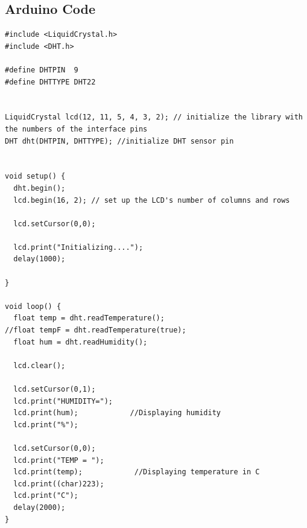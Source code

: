 \subsection{Arduino Code}
    \begin{lstlisting}[style = Arduino]
#include <LiquidCrystal.h>
#include <DHT.h>

#define DHTPIN  9
#define DHTTYPE DHT22 


LiquidCrystal lcd(12, 11, 5, 4, 3, 2); // initialize the library with the numbers of the interface pins
DHT dht(DHTPIN, DHTTYPE); //initialize DHT sensor pin


void setup() {
  dht.begin();
  lcd.begin(16, 2); // set up the LCD's number of columns and rows
  
  lcd.setCursor(0,0);

  lcd.print("Initializing....");
  delay(1000);

}

void loop() {
  float temp = dht.readTemperature();
//float tempF = dht.readTemperature(true);
  float hum = dht.readHumidity();

  lcd.clear();
  
  lcd.setCursor(0,1);
  lcd.print("HUMIDITY=");
  lcd.print(hum);            //Displaying humidity
  lcd.print("%");

  lcd.setCursor(0,0);
  lcd.print("TEMP = ");
  lcd.print(temp);            //Displaying temperature in C
  lcd.print((char)223);
  lcd.print("C");
  delay(2000);
}
 
 \end{lstlisting}